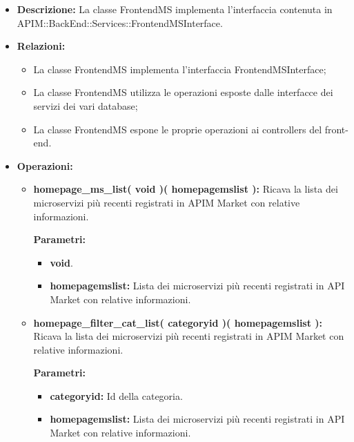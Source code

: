 \begin{itemize}
	\item \textbf{Descrizione:} La classe FrontendMS implementa l'interfaccia contenuta in APIM::BackEnd::Services::FrontendMSInterface.
	\item \textbf{Relazioni:}
		\begin{itemize}
			\item La classe FrontendMS implementa l'interfaccia FrontendMSInterface;
			\item La classe FrontendMS utilizza le operazioni esposte dalle interfacce dei servizi dei vari database;
			\item La classe FrontendMS espone le proprie operazioni ai controllers del front-end.
		\end{itemize}
	\item \textbf{Operazioni:}
		\begin{itemize}
		
			\item \textbf{homepage\_ms\_list( void )( homepagemslist ):} Ricava la lista dei microservizi più recenti registrati in APIM Market con relative informazioni.
				\begin{description}
    				\item[\textbf{Parametri:}]
				\end{description}
				\begin{itemize}
					\item \textbf{void}.
					\item \textbf{homepagemslist:} Lista dei microservizi più recenti registrati in API Market con relative informazioni.
				\end{itemize}
			
			\item \textbf{homepage\_filter\_cat\_list( categoryid )( homepagemslist ):} Ricava la lista dei microservizi più recenti registrati in APIM Market con relative informazioni.
				\begin{description}
    				\item[\textbf{Parametri:}]
				\end{description}
				\begin{itemize}
					\item \textbf{categoryid:} Id della categoria.
					\item \textbf{homepagemslist:} Lista dei microservizi più recenti registrati in API Market con relative informazioni.
				\end{itemize}
				
		\end{itemize}
\end{itemize}